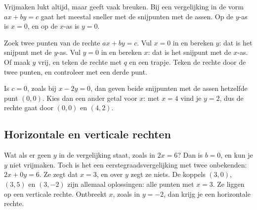 Vrijmaken lukt altijd, maar geeft vaak breuken. Bij een vergelijking in de vorm $ax + by = c$ gaat het meestal sneller met de snijpunten met de assen. Op de $y$-as is $x = 0$, en op de $x$-as is $y = 0$.


\begin{werkwijze}
Zoek twee punten van de rechte $ax + by = c$. Vul $x = 0$ in en bereken $y$: dat is het snijpunt met de $y$-as. Vul $y = 0$ in en bereken $x$: dat is het snijpunt met de $x$-as. Of maak $y$ vrij, en teken de rechte met $q$ en een trapje. Teken de rechte door de twee punten, en controleer met een derde punt.
\end{werkwijze}

Is $c = 0$, zoals bij $x - 2y = 0$, dan geven beide snijpunten met de assen hetzelfde punt $(0, 0)$. Kies dan een ander getal voor $x$: met $x = 4$ vind je $y = 2$, dus de rechte gaat door $(0, 0)$ en $(4, 2)$.


\begin{oefeningen}
\end{oefeningen}

\subsection{Horizontale en verticale rechten}

Wat als er geen $y$ in de vergelijking staat, zoals in $2x = 6$? Dan is $b = 0$, en kun je $y$ niet vrijmaken. Toch is het een eerstegraadsvergelijking met twee onbekenden: $2x + 0y = 6$. Ze zegt dat $x = 3$, en over $y$ zegt ze niets. De koppels $(3, 0)$, $(3, 5)$ en $(3, -2)$ zijn allemaal oplossingen: alle punten met $x = 3$. Ze liggen op een verticale rechte. Ontbreekt $x$, zoals in $y = -2$, dan krijg je een horizontale rechte.

